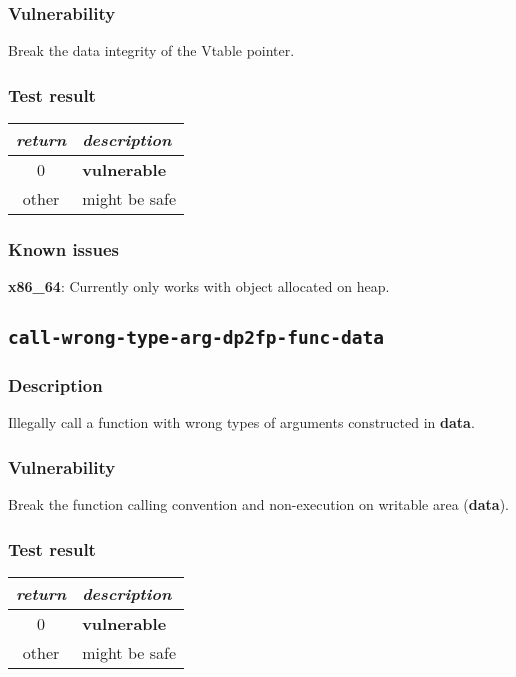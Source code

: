 \documentclass[a4paper]{book}
\begin{document}
\subsubsection{Vulnerability}
Break the data integrity of the Vtable pointer.

\subsubsection{Test result}
\begin{tabular}{cl}
  \toprule
  \emph{return}  & \emph{description} \\
  \midrule
  0              & \textbf{vulnerable} \\
  other          & might be safe \\
  \bottomrule
\end{tabular}

\subsubsection{Known issues}

\textbf{x86\_64}: Currently only works with object allocated on heap.

\newpage
\subsection{\texttt{call-wrong-type-arg-dp2fp-func-data}}\label{test-call-wrong-type-arg-dp2fp-func-data}

\subsubsection{Description}
Illegally call a function with wrong types of arguments constructed in \textbf{data}.

\subsubsection{Vulnerability}
Break the function calling convention and non-execution on writable area (\textbf{data}).

\subsubsection{Test result}
\begin{tabular}{cl}
  \toprule
  \emph{return}  & \emph{description} \\
  \midrule
  0              & \textbf{vulnerable} \\
  other          & might be safe \\
  \bottomrule
\end{tabular}
\end{document}
